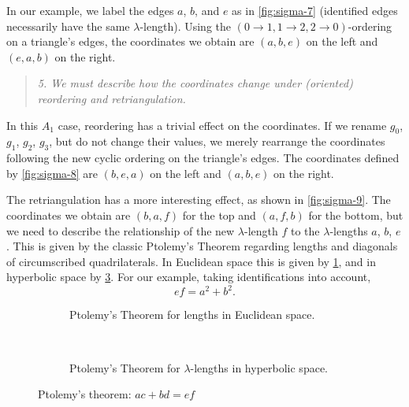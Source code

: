 \documentclass{amsart}
\theoremstyle{plain}
\theoremstyle{definition}
\theoremstyle{remark}
\begin{document}
  In our example, we label the edges $a$, $b$, and $e$ as in
  \cref{fig:sigma-7} (identified edges necessarily have the same
  $\lambda$-length). Using the $(0 \to 1,1 \to 2,2 \to 0)$-ordering on a
  triangle's edges, the coordinates we obtain are $(a,b,e)$ on the left
  and $(e,a,b)$ on the right.

  \begin{quote}
    \emph{5. We must describe how the coordinates change under
      (oriented) reordering and retriangulation.}
  \end{quote}

  In this $A_1$ case, reordering has a trivial effect on the
  coordinates. If we rename $g_0$, $g_1$, $g_2$, $g_3$, but do not
  change their values, we merely rearrange the coordinates following the
  new cyclic ordering on the triangle's edges. The coordinates defined
  by \cref{fig:sigma-8} are $(b,e,a)$ on the left and $(a,b,e)$ on the
  right.

  The retriangulation has a more interesting effect, as shown in
  \cref{fig:sigma-9}. The coordinates we obtain are $(b,a,f)$ for the
  top and $(a,f,b)$ for the bottom, but we need to describe the
  relationship of the new $\lambda$-length $f$ to the $\lambda$-lengths
  $a$, $b$, $e$. This is given by the classic Ptolemy's Theorem
  regarding lengths and diagonals of circumscribed quadrilaterals. In
  Euclidean space this is given by \cref{fig:ptolemy-euclidean}, and in
  hyperbolic space by \cref{fig:ptolemy-hyperbolic}. For our example,
  taking identifications into account, \[ ef = a^2 + b^2. \]

  \begin{figure}[h]
    \centering
    \begin{subfigure}[t]{0.40\textwidth}
      \centering
      
      \caption{Ptolemy's Theorem for lengths in Euclidean space.
        \label{fig:ptolemy-euclidean}
      }
    \end{subfigure}
    ~ \hspace{0.05\textwidth} ~
    \begin{subfigure}[t]{0.40\textwidth}
      \centering
      

      \caption{Ptolemy's Theorem for $\lambda$-lengths in hyperbolic
        space.
        \label{fig:ptolemy-hyperbolic}
      }
    \end{subfigure}
    \caption{Ptolemy's theorem: $ac + bd = ef$}
  \end{figure}
\end{document}
